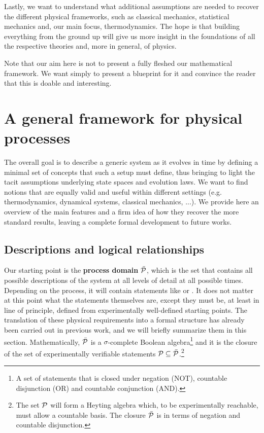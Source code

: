 \documentclass[letterpaper]{article}
\begin{document}
Lastly, we want to understand what additional assumptions are needed to recover the different physical frameworks, such as classical mechanics, statistical mechanics and, our main focus, thermodynamics. The hope is that building everything from the ground up will give us more insight in the foundations of all the respective theories and, more in general, of physics.

Note that our aim here is not to present a fully fleshed our mathematical framework. We want simply to present a blueprint for it and convince the reader that this is doable and interesting.


\section{A general framework for physical processes}

The overall goal is to describe a generic system as it evolves in time by defining a minimal set of concepts that such a setup must define, thus bringing to light the tacit assumptions underlying state spaces and evolution laws. We want to find notions that are equally valid and useful within different settings (e.g. thermodynamics, dynamical systems, classical mechanics, ...). We provide here an overview of the main features and a firm idea of how they recover the more standard results, leaving a complete formal development to future works.

\subsection{Descriptions and logical relationships}

Our starting point is the \textbf{process domain} $\tdomain[P]$, which is the set that contains all possible descriptions of the system at all levels of detail at all possible times. Depending on the process, it will contain statements like  or . It does not matter at this point what the statements themselves are, except they must be, at least in line of principle, defined from experimentally well-defined starting points. The translation of these physical requirements into a formal structure has already been carried out in previous work, and we will briefly summarize them in this section. Mathematically, $\tdomain[P]$ is a $\sigma$-complete Boolean algebra\footnote{A set of statements that is closed under negation (NOT), countable disjunction (OR) and countable conjunction (AND).} and it is the closure of the set of experimentally verifiable statements $\edomain[P] \subseteq \tdomain[P]$.\footnote{The set $\edomain[P]$ will form a Heyting algebra which, to be experimentally reachable, must allow a countable basis. The closure $\tdomain[P]$ is in terms of negation and countable disjunction.}
\end{document}
